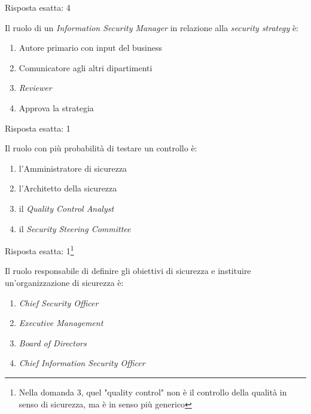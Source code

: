 \begin{Answer} [
  ref={esSA2},
  number={2}
  ]

  \Question Risposta esatta: 4
\end{Answer}


\begin{Exercise} [
  title={Quiz},
  label={esSA3}
  ]

  \Question Il ruolo di un \textit{Information Security Manager} in relazione 
alla \textit{security strategy} è:
\begin{enumerate}
 \item Autore primario con input del business
 \item Comunicatore agli altri dipartimenti
 \item \textit{Reviewer}
 \item Approva la strategia
\end{enumerate}
  
\end{Exercise}

\begin{Answer} [
  ref={esSA3},
  number={3}
  ]

  \Question Risposta esatta: 1
\end{Answer}



\begin{Exercise} [
  title={Quiz},
  label={esSA4}
  ]

  \Question Il ruolo con più probabilità di testare un controllo è:
  \begin{enumerate}
   \item l'Amministratore di sicurezza
   \item l'Architetto della sicurezza
   \item il \textit{Quality Control Analyst}
   \item il \textit{Security Steering Committee}
  \end{enumerate}

\end{Exercise}

\begin{Answer} [
  ref={esSA4},
  number={4}
  ]

  \Question Risposta esatta: 1\footnote{Nella domanda 3, quel "quality control" 
non è il controllo della qualità in senso di sicurezza, ma è in senso più 
generico}
\end{Answer}


\begin{Exercise} [
  title={Quiz},
  label={esSA5}
  ]

  \Question Il ruolo responsabile di definire gli obiettivi di sicurezza e 
instituire un'organizzazione di sicurezza è:
\begin{enumerate}
 \item \textit{Chief Security Officer}
 \item \textit{Executive Management}
 \item \textit{Board of Directors}
 \item \textit{Chief Information Security Officer}
\end{enumerate}

\end{Exercise}

